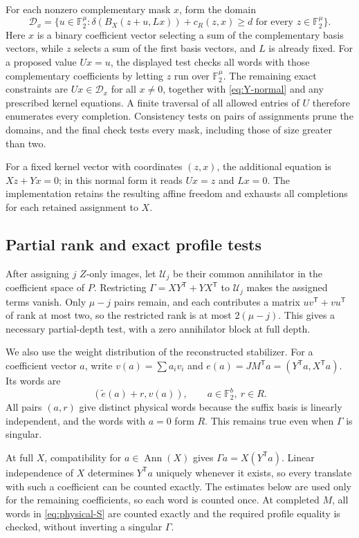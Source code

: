 \documentclass[11pt]{article}
\theoremstyle{definition}
\theoremstyle{remark}
\newcommand{\F}{\mathbb F_2}
\newcommand{\Ann}{\operatorname{Ann}}
\newcommand{\tr}{\mathsf T}
\begin{document}
For each nonzero complementary mask \(x\), form the domain
\[
 \mathcal D_x=\{u\in\F^\mu:\delta(B_X(z+u,Lx))+
                       c_R(z,x)\geq d\text{ for every }z\in\F^\mu\}.
\]
Here \(x\) is a binary coefficient vector selecting a sum of the
complementary basis vectors, while \(z\) selects a sum of the first
basis vectors, and \(L\) is already fixed. For a proposed value
\(Ux=u\), the displayed test checks all words with those complementary
coefficients by letting \(z\) run over \(\F^\mu\). The remaining exact
constraints are \(Ux\in\mathcal D_x\) for all \(x\ne0\), together with
\eqref{eq:Y-normal} and any prescribed kernel equations. A finite
traversal of all allowed entries of \(U\) therefore enumerates every
completion. Consistency tests on pairs of assignments prune the domains,
and the final check tests every mask, including those of size greater
than two.

For a fixed kernel vector with coordinates \((z,x)\), the additional
equation is \(Xz+Yx=0\); in this normal form it reads \(Ux=z\) and
\(Lx=0\). The implementation retains the resulting affine freedom and
exhausts all completions for each retained assignment to \(X\).

\subsection{Partial rank and exact profile tests}\label{sec:profile}

After assigning \(j\) \(Z\)-only images, let \(\mathcal U_j\) be their
common annihilator in the coefficient space of \(P\). Restricting
\(\Gamma=XY^\tr+YX^\tr\) to \(\mathcal U_j\) makes the assigned terms
vanish. Only \(\mu-j\) pairs remain, and each contributes a matrix
\(uv^\tr+vu^\tr\) of rank at most two, so the restricted rank is at most
\(2(\mu-j)\). This gives a necessary partial-depth test, with a zero
annihilator block at full depth.

We also use the weight distribution of the reconstructed stabilizer. For
a coefficient vector \(a\), write \(v(a)=\sum a_iv_i\) and
\(e(a)=JM^\tr a=(Y^\tr a,X^\tr a)\). Its words are
\begin{equation}\label{eq:physical-S}
 (\widetilde e(a)+r,v(a)),\qquad a\in\F^b,\ r\in R.
\end{equation}
All pairs \((a,r)\) give distinct physical words because the suffix
basis is linearly independent, and the words with \(a=0\) form \(R\).
This remains true even when \(\Gamma\) is singular.

At full \(X\), compatibility for \(a\in\Ann(X)\) gives
\(\Gamma a=X(Y^\tr a)\). Linear independence of \(X\) determines
\(Y^\tr a\) uniquely whenever it exists, so every translate with such a
coefficient can be counted exactly. The estimates below are used only
for the remaining coefficients, so each word is counted once. At
completed \(M\), all words in \eqref{eq:physical-S} are counted
exactly and the required profile equality is checked, without inverting
a singular \(\Gamma\).
\end{document}
